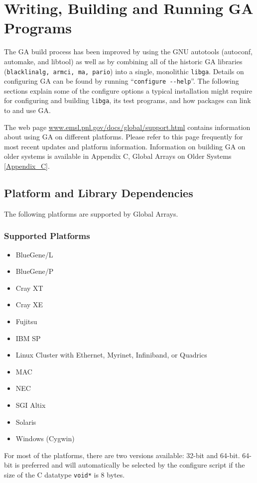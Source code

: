 \chapter{Writing, Building and Running GA Programs}

The GA build process has been improved by using the GNU autotools (autoconf,
automake, and libtool) as well as by combining all of the historic GA libraries
(\texttt{blacklinalg, armci, ma, pario}) into a single, monolithic
\texttt{libga}.  Details on configuring GA can be found by running
``\texttt{configure -{}-help}''. The following sections explain some of the
configure options a typical installation might require for configuring and
building \texttt{libga}, its test programs, and how packages can link to and
use GA. 

The web page \url{www.emsl.pnl.gov/docs/global/support.html} contains
information about using GA on different platforms. Please refer to this page
frequently for most recent updates and platform information.  Information on
building GA on older systems is available in Appendix C, Global Arrays on Older
Systems \ref{Appendix_C}.

\section{Platform and Library Dependencies}

The following platforms are supported by Global Arrays. 

\subsection{Supported Platforms}
\begin{itemize}
\item BlueGene/L 
\item BlueGene/P 
\item Cray XT 
\item Cray XE 
\item Fujitsu 
\item IBM SP
\item Linux Cluster with Ethernet, Myrinet, Infiniband, or Quadrics
\item MAC
\item NEC 
\item SGI Altix
\item Solaris
\item Windows (Cygwin) 
\end{itemize}

For most of the platforms, there are two versions available: 32-bit and 64-bit.
64-bit is preferred and will automatically be selected by the configure script
if the size of the C datatype \texttt{void{*}} is 8 bytes. 

